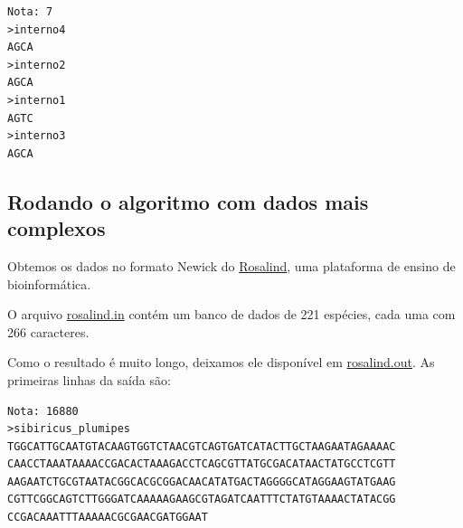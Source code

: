 \documentclass[11pt]{article}
\begin{document}
\begin{verbatim}
Nota: 7
>interno4
AGCA
>interno2
AGCA
>interno1
AGTC
>interno3
AGCA
\end{verbatim}



\subsection{Rodando o algoritmo com dados mais complexos}
\label{sec-3-6}

Obtemos os dados no formato Newick do \href{http://rosalind.info}{Rosalind}, uma plataforma de
ensino de bioinformática.

O arquivo \href{https://github.com/adusca/FGV-EDA/blob/master/6_30/rosalind.in}{rosalind.in} contém um banco de dados de 221 espécies, cada
uma com 266 caracteres.

Como o resultado é muito longo, deixamos ele disponível em
\href{https://github.com/adusca/FGV-EDA/blob/master/6_30/rosalind.out}{rosalind.out}. As primeiras linhas da saída são:

\begin{verbatim}
Nota: 16880
>sibiricus_plumipes
TGGCATTGCAATGTACAAGTGGTCTAACGTCAGTGATCATACTTGCTAAGAATAGAAAAC
CAACCTAAATAAAACCGACACTAAAGACCTCAGCGTTATGCGACATAACTATGCCTCGTT
AAGAATCTGCGTAATACGGCACGCGGACAACATATGACTAGGGGCATAGGAAGTATGAAG
CGTTCGGCAGTCTTGGGATCAAAAAGAAGCGTAGATCAATTTCTATGTAAAACTATACGG
CCGACAAATTTAAAAACGCGAACGATGGAAT
\end{verbatim}
\end{document}
